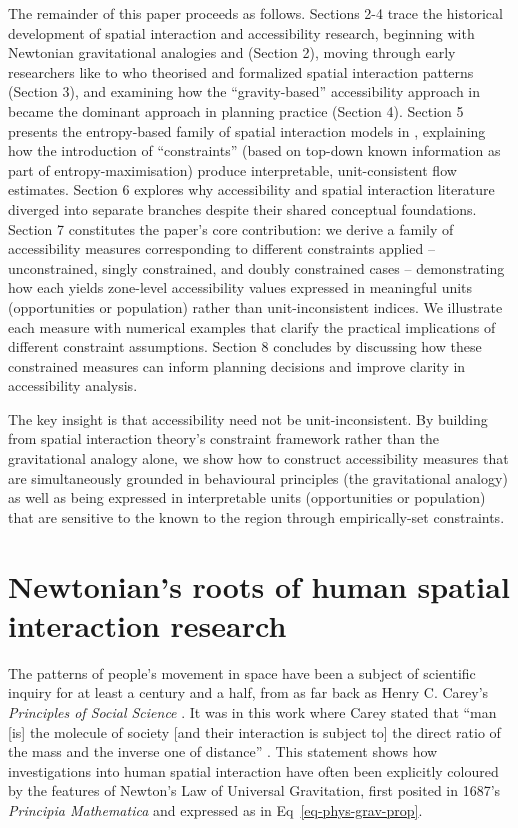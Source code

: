 \documentclass[
  10pt,
  letterpaper,
]{article}
\begin{document}
The remainder of this paper proceeds as follows. Sections 2-4 trace the
historical development of spatial interaction and accessibility
research, beginning with Newtonian gravitational analogies and
\citet{careyPrinciplesSocialScience1858} (Section 2), moving through
early researchers like \citet{ravensteinLawsMigration1885} to
\citet{stewartDemographicGravitationEvidence1948} who theorised and
formalized spatial interaction patterns (Section 3), and examining how
the ``gravity-based'' accessibility approach in \citet{hansen1959}
became the dominant approach in planning practice (Section 4). Section 5
presents the entropy-based family of spatial interaction models in
\citet{wilson1971}, explaining how the introduction of ``constraints''
(based on top-down known information as part of entropy-maximisation)
produce interpretable, unit-consistent flow estimates. Section 6
explores why accessibility and spatial interaction literature diverged
into separate branches despite their shared conceptual foundations.
Section 7 constitutes the paper's core contribution: we derive a family
of accessibility measures corresponding to different constraints applied
-- unconstrained, singly constrained, and doubly constrained cases --
demonstrating how each yields zone-level accessibility values expressed
in meaningful units (opportunities or population) rather than
unit-inconsistent indices. We illustrate each measure with numerical
examples that clarify the practical implications of different constraint
assumptions. Section 8 concludes by discussing how these constrained
measures can inform planning decisions and improve clarity in
accessibility analysis.

The key insight is that accessibility need not be unit-inconsistent. By
building from spatial interaction theory's constraint framework rather
than the gravitational analogy alone, we show how to construct
accessibility measures that are simultaneously grounded in behavioural
principles (the gravitational analogy) as well as being expressed in
interpretable units (opportunities or population) that are sensitive to
the known to the region through empirically-set constraints.

\section{Newtonian's roots of human spatial interaction
research}\label{newtonians-roots-of-human-spatial-interaction-research}

The patterns of people's movement in space have been a subject of
scientific inquiry for at least a century and a half, from as far back
as Henry C. Carey's \emph{Principles of Social Science}
\citep{careyPrinciplesSocialScience1858}. It was in this work where
Carey stated that ``man {[}is{]} the molecule of society {[}and their
interaction is subject to{]} the direct ratio of the mass and the
inverse one of distance'' \citep[pp.~37-38]{mckeanManual1883}. This
statement shows how investigations into human spatial interaction have
often been explicitly coloured by the features of Newton's Law of
Universal Gravitation, first posited in 1687's \emph{Principia
Mathematica} and expressed as in Eq~\ref{eq-phys-grav-prop}.
\end{document}
